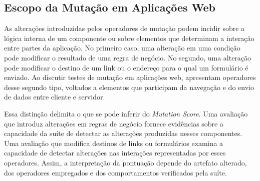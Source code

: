 \subsection{Escopo da Mutação em Aplicações Web}

As alterações introduzidas pelos operadores de mutação podem incidir sobre a lógica interna de um componente ou sobre elementos que determinam a interação entre partes da aplicação. No primeiro caso, uma alteração em uma condição pode modificar o resultado de uma regra de negócio. No segundo, uma alteração pode modificar o destino de um link ou o endereço para o qual um formulário é enviado. Ao discutir testes de mutação em aplicações web,  apresentam operadores desse segundo tipo, voltados a elementos que participam da navegação e do envio de dados entre cliente e servidor.

Essa distinção delimita o que se pode inferir do \textit{Mutation Score}. Uma avaliação que introduz alterações em regras de negócio fornece evidências sobre a capacidade da suíte de detectar as alterações produzidas nesses componentes. Uma avaliação que modifica destinos de links ou formulários examina a capacidade de detectar alterações nas interações representadas por esses operadores. Assim, a interpretação da pontuação depende do artefato alterado, dos operadores empregados e dos comportamentos verificados pela suíte.